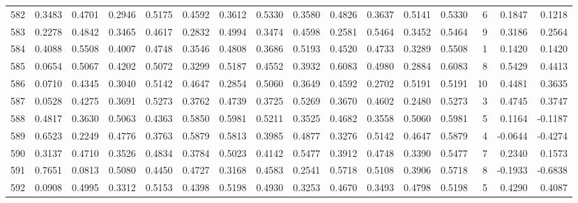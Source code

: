 \begin{tabular}{lrrrrrrrrrrrrrrr}
582 &      0.3483 &  0.4701 &  0.2946 &  0.5175 &  0.4592 &  0.3612 &  0.5330 &  0.3580 &  0.4826 &  0.3637 &   0.5141 &     0.5330 &      6 &                    0.1847 &                     0.1218 \\
583 &      0.2278 &  0.4842 &  0.3465 &  0.4617 &  0.2832 &  0.4994 &  0.3474 &  0.4598 &  0.2581 &  0.5464 &   0.3452 &     0.5464 &      9 &                    0.3186 &                     0.2564 \\
584 &      0.4088 &  0.5508 &  0.4007 &  0.4748 &  0.3546 &  0.4808 &  0.3686 &  0.5193 &  0.4520 &  0.4733 &   0.3289 &     0.5508 &      1 &                    0.1420 &                     0.1420 \\
585 &      0.0654 &  0.5067 &  0.4202 &  0.5072 &  0.3299 &  0.5187 &  0.4552 &  0.3932 &  0.6083 &  0.4980 &   0.2884 &     0.6083 &      8 &                    0.5429 &                     0.4413 \\
586 &      0.0710 &  0.4345 &  0.3040 &  0.5142 &  0.4647 &  0.2854 &  0.5060 &  0.3649 &  0.4592 &  0.2702 &   0.5191 &     0.5191 &     10 &                    0.4481 &                     0.3635 \\
587 &      0.0528 &  0.4275 &  0.3691 &  0.5273 &  0.3762 &  0.4739 &  0.3725 &  0.5269 &  0.3670 &  0.4602 &   0.2480 &     0.5273 &      3 &                    0.4745 &                     0.3747 \\
588 &      0.4817 &  0.3630 &  0.5063 &  0.4363 &  0.5850 &  0.5981 &  0.5211 &  0.3525 &  0.4682 &  0.3558 &   0.5060 &     0.5981 &      5 &                    0.1164 &                    -0.1187 \\
589 &      0.6523 &  0.2249 &  0.4776 &  0.3763 &  0.5879 &  0.5813 &  0.3985 &  0.4877 &  0.3276 &  0.5142 &   0.4647 &     0.5879 &      4 &                   -0.0644 &                    -0.4274 \\
590 &      0.3137 &  0.4710 &  0.3526 &  0.4834 &  0.3784 &  0.5023 &  0.4142 &  0.5477 &  0.3912 &  0.4748 &   0.3390 &     0.5477 &      7 &                    0.2340 &                     0.1573 \\
591 &      0.7651 &  0.0813 &  0.5080 &  0.4450 &  0.4727 &  0.3168 &  0.4583 &  0.2541 &  0.5718 &  0.5108 &   0.3906 &     0.5718 &      8 &                   -0.1933 &                    -0.6838 \\
592 &      0.0908 &  0.4995 &  0.3312 &  0.5153 &  0.4398 &  0.5198 &  0.4930 &  0.3253 &  0.4670 &  0.3493 &   0.4798 &     0.5198 &      5 &                    0.4290 &                     0.4087 \\

\end{tabular}
